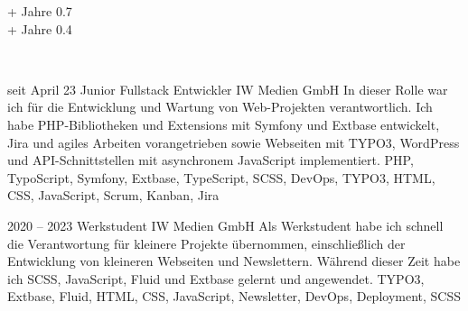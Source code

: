 \begin{paracol}{2}
\begin{leftcolumn}
 {\number\numexpr{}\relax+ Jahre} {0.7} \\[-2pt]

 {\number\numexpr{}\relax+ Jahre} {0.4} \\[-2pt]

\end{leftcolumn}

\begin{rightcolumn}

 \\[14pt]
\vspace{-12pt}


\cveventAccent
	{seit April 23}
	{Junior Fullstack Entwickler}
	{IW Medien GmbH}
	{
		In dieser Rolle war ich für die Entwicklung und Wartung von Web-Projekten verantwortlich. Ich habe PHP-Bibliotheken und Extensions mit Symfony und Extbase entwickelt, Jira und agiles Arbeiten vorangetrieben sowie Webseiten mit TYPO3, WordPress und API-Schnittstellen mit asynchronem JavaScript implementiert.
	}
	{PHP, TypoScript, Symfony, Extbase, TypeScript, SCSS, DevOps, TYPO3, HTML, CSS, JavaScript, Scrum, Kanban, Jira}
\vfill\null

\vspace{6pt}

\cvevent
	{2020 – 2023}
	{Werkstudent}
	{IW Medien GmbH}
	{
		Als Werkstudent habe ich schnell die Verantwortung für kleinere Projekte übernommen, einschließlich der Entwicklung von kleineren Webseiten und Newslettern. Während dieser Zeit habe ich SCSS, JavaScript, Fluid und Extbase gelernt und angewendet.
	}
	{TYPO3, Extbase, Fluid, HTML, CSS, JavaScript, Newsletter, DevOps, Deployment, SCSS}
\vfill\null


\end{rightcolumn}
\end{paracol}
